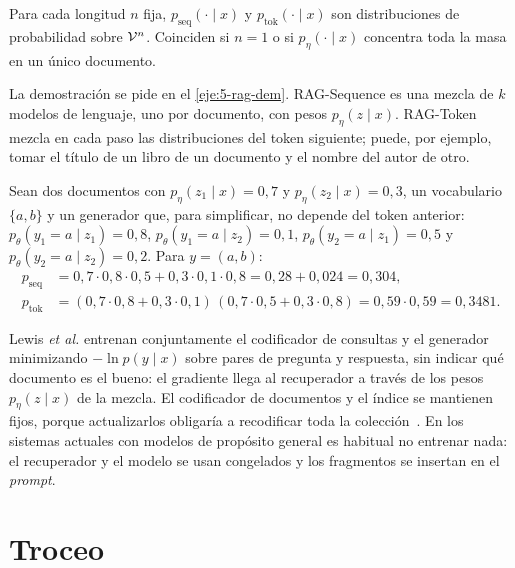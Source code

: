 \begin{proposicion}\label{prop:rag}
Para cada longitud $n$ fija, $p_{\mathrm{seq}}(\cdot\mid x)$ y $p_{\mathrm{tok}}(\cdot\mid x)$ son distribuciones de probabilidad sobre $\mathcal{V}^{n}$. Coinciden si $n=1$ o si $p_\eta(\cdot\mid x)$ concentra toda la masa en un único documento.
\end{proposicion}

La demostración se pide en el \cref{eje:5-rag-dem}. RAG-Sequence es una mezcla de $k$ modelos de lenguaje, uno por documento, con pesos $p_\eta(z\mid x)$. RAG-Token mezcla en cada paso las distribuciones del token siguiente; puede, por ejemplo, tomar el título de un libro de un documento y el nombre del autor de otro.

\begin{ejemplo}\label{ej:rag}
Sean dos documentos con $p_\eta(z_1\mid x)=0{,}7$ y $p_\eta(z_2\mid x)=0{,}3$, un vocabulario $\{a,b\}$ y un generador que, para simplificar, no depende del token anterior: $p_\theta(y_1=a\mid z_1)=0{,}8$, $p_\theta(y_1=a\mid z_2)=0{,}1$, $p_\theta(y_2=a\mid z_1)=0{,}5$ y $p_\theta(y_2=a\mid z_2)=0{,}2$. Para $y=(a,b)$:
\[
\begin{aligned}
p_{\mathrm{seq}}&=0{,}7\cdot 0{,}8\cdot 0{,}5+0{,}3\cdot 0{,}1\cdot 0{,}8=0{,}28+0{,}024=0{,}304,\\
p_{\mathrm{tok}}&=(0{,}7\cdot 0{,}8+0{,}3\cdot 0{,}1)\,(0{,}7\cdot 0{,}5+0{,}3\cdot 0{,}8)=0{,}59\cdot 0{,}59=0{,}3481.
\end{aligned}
\]
\end{ejemplo}

\begin{observacion}[Entrenamiento]
Lewis \emph{et al.} entrenan conjuntamente el codificador de consultas y el generador minimizando $-\ln p(y\mid x)$ sobre pares de pregunta y respuesta, sin indicar qué documento es el bueno: el gradiente llega al recuperador a través de los pesos $p_\eta(z\mid x)$ de la mezcla. El codificador de documentos y el índice se mantienen fijos, porque actualizarlos obligaría a recodificar toda la colección~\cite[§2.4]{rag}. En los sistemas actuales con modelos de propósito general es habitual no entrenar nada: el recuperador y el modelo se usan congelados y los fragmentos se insertan en el \emph{prompt}.
\end{observacion}

\section{Troceo}

